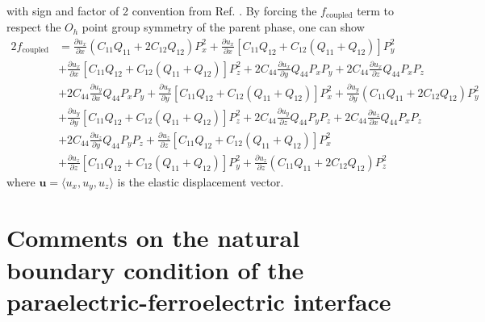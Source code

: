 \documentclass[22pt]{article} %
\begin{document}
%
with sign and factor of 2 convention from Ref. \cite{Li2001, Hlinka2006}. By forcing the $f_\mathrm{coupled}$ term to respect the $O_h$ point group symmetry of the parent phase, one can show
%
\begin{align}\nonumber
2 f_\mathrm{coupled} &= \frac{\partial u_x}{\partial x} \left(C_{11} Q_{11} + 2 C_{12} Q_{12} \right) P_x^2 + \frac{\partial u_x}{\partial x} \left[C_{11} Q_{12} + C_{12} \left(Q_{11} + Q_{12} \right)\right] P_y^2 \\ \nonumber
&+ \frac{\partial u_x}{\partial x} \left[C_{11} Q_{12} + C_{12} \left(Q_{11} + Q_{12} \right)\right] P_z^2 + 2 C_{44} \frac{\partial u_x}{\partial y} Q_{44} P_x P_y  + 2 C_{44} \frac{\partial u_x}{\partial z} Q_{44} P_x P_z\\ \nonumber
&+ 2 C_{44} \frac{\partial u_y}{\partial x} Q_{44} P_x P_y + \frac{\partial u_y}{\partial y} \left[C_{11} Q_{12} + C_{12} \left(Q_{11} + Q_{12} \right)\right] P_x^2 + \frac{\partial u_y}{\partial y} \left(C_{11} Q_{11} + 2 C_{12} Q_{12}\right) P_y^2 \\ \nonumber
&+ \frac{\partial u_y}{\partial y} \left[C_{11} Q_{12} + C_{12} \left(Q_{11} + Q_{12} \right)\right]  P_z^2 + 2 C_{44} \frac{\partial u_y}{\partial z} Q_{44} P_y P_z + 2 C_{44} \frac{\partial u_z}{\partial x} Q_{44} P_x P_z \\ \nonumber
&+ 2 C_{44} \frac{\partial u_z}{\partial y} Q_{44} P_y P_z + \frac{\partial u_z}{\partial z} \left[C_{11} Q_{12} + C_{12} \left(Q_{11} + Q_{12} \right)\right] P_x^2 \\ \nonumber
&+ \frac{\partial u_z}{\partial z} \left[C_{11} Q_{12} + C_{12} \left(Q_{11} + Q_{12} \right)\right] P_y^2 + \frac{\partial u_z}{\partial z} \left(C_{11} Q_{11} + 2 C_{12} Q_{12} \right) P_z^2
\end{align}
%
where $\textbf{u} = \langle u_x, u_y, u_z \rangle$ is the elastic displacement vector.
%

%

%
\section{Comments on the natural boundary condition of the paraelectric-ferroelectric interface}
%
\end{document}
